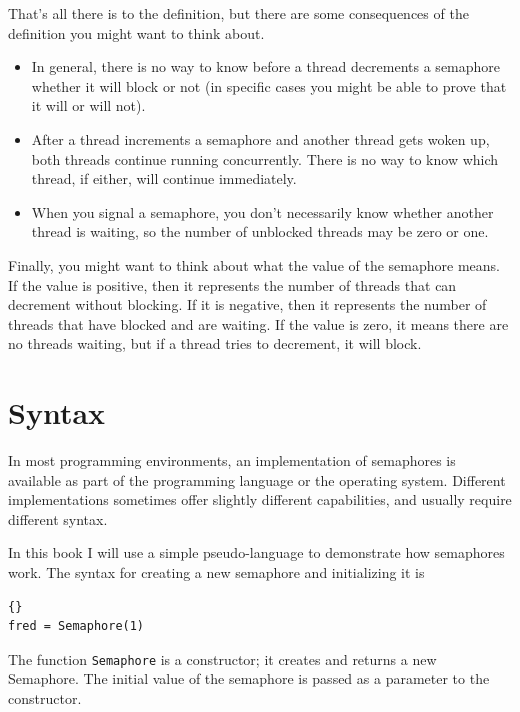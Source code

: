 \documentclass{book}
\begin{document}
That's all there is to the definition, but there are some
consequences of the definition you might want to think about.

\begin{itemize}

\item In general, there is no way to know before a thread decrements a
semaphore whether it will block or not (in specific cases you might
be able to prove that it will or will not).

\item After a thread increments a semaphore and another thread gets
woken up, both threads continue running concurrently.  There is no way
to know which thread, if either, will continue immediately.

\item When you signal a semaphore, you don't necessarily know whether
another thread is waiting, so the number of unblocked threads may
be zero or one.

\end{itemize}

Finally, you might want to think about what the value of the
semaphore means.  If the value is positive, then it represents the
number of threads that can decrement without blocking.  If it
is negative, then it represents the number of threads that have
blocked and are waiting.  If the value is zero, it means there
are no threads waiting, but if a thread tries to decrement, it
will block.


\section{Syntax}

In most programming environments, an implementation of semaphores is
available as part of the programming language or the operating system.
Different implementations sometimes offer slightly different
capabilities, and usually require different syntax.

In this book I will use a simple pseudo-language to demonstrate
how semaphores work.  The syntax for creating a new semaphore
and initializing it is
%
\begin{lstlisting}[title={Semaphore initialization syntax}]{}
fred = Semaphore(1)
\end{lstlisting}
%
The function {\tt Semaphore} is a constructor; it creates and
returns a new Semaphore.  The initial value of the semaphore
is passed as a parameter to the constructor.
\end{document}
